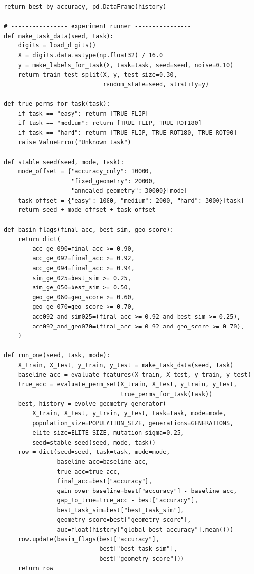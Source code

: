 \documentclass[11pt,a4paper]{report}
\begin{document}
\begin{lstlisting}[style=python,caption={Unified Python code for Meta-SBOHN v5/v6 tests.}]
    return best_by_accuracy, pd.DataFrame(history)

# ---------------- experiment runner ----------------
def make_task_data(seed, task):
    digits = load_digits()
    X = digits.data.astype(np.float32) / 16.0
    y = make_labels_for_task(X, task=task, seed=seed, noise=0.10)
    return train_test_split(X, y, test_size=0.30,
                            random_state=seed, stratify=y)

def true_perms_for_task(task):
    if task == "easy": return [TRUE_FLIP]
    if task == "medium": return [TRUE_FLIP, TRUE_ROT180]
    if task == "hard": return [TRUE_FLIP, TRUE_ROT180, TRUE_ROT90]
    raise ValueError("Unknown task")

def stable_seed(seed, mode, task):
    mode_offset = {"accuracy_only": 10000,
                   "fixed_geometry": 20000,
                   "annealed_geometry": 30000}[mode]
    task_offset = {"easy": 1000, "medium": 2000, "hard": 3000}[task]
    return seed + mode_offset + task_offset

def basin_flags(final_acc, best_sim, geo_score):
    return dict(
        acc_ge_090=final_acc >= 0.90,
        acc_ge_092=final_acc >= 0.92,
        acc_ge_094=final_acc >= 0.94,
        sim_ge_025=best_sim >= 0.25,
        sim_ge_050=best_sim >= 0.50,
        geo_ge_060=geo_score >= 0.60,
        geo_ge_070=geo_score >= 0.70,
        acc092_and_sim025=(final_acc >= 0.92 and best_sim >= 0.25),
        acc092_and_geo070=(final_acc >= 0.92 and geo_score >= 0.70),
    )

def run_one(seed, task, mode):
    X_train, X_test, y_train, y_test = make_task_data(seed, task)
    baseline_acc = evaluate_features(X_train, X_test, y_train, y_test)
    true_acc = evaluate_perm_set(X_train, X_test, y_train, y_test,
                                 true_perms_for_task(task))
    best, history = evolve_geometry_generator(
        X_train, X_test, y_train, y_test, task=task, mode=mode,
        population_size=POPULATION_SIZE, generations=GENERATIONS,
        elite_size=ELITE_SIZE, mutation_sigma=0.25,
        seed=stable_seed(seed, mode, task))
    row = dict(seed=seed, task=task, mode=mode,
               baseline_acc=baseline_acc,
               true_acc=true_acc,
               final_acc=best["accuracy"],
               gain_over_baseline=best["accuracy"] - baseline_acc,
               gap_to_true=true_acc - best["accuracy"],
               best_task_sim=best["best_task_sim"],
               geometry_score=best["geometry_score"],
               auc=float(history["global_best_accuracy"].mean()))
    row.update(basin_flags(best["accuracy"],
                           best["best_task_sim"],
                           best["geometry_score"]))
    return row


\end{lstlisting}
\end{document}
